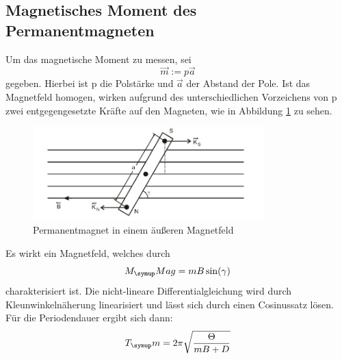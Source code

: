 \subsection{Magnetisches Moment des Permanentmagneten}
Um das magnetische Moment zu messen, sei
\begin{equation}
  \vec{m}:=p\vec{a}
\end{equation}
gegeben. Hierbei ist p die Polstärke und $\vec{a}$ der Abstand der Pole. Ist das
Magnetfeld homogen, wirken aufgrund des unterschiedlichen Vorzeichens von p zwei
entgegengesetzte Kräfte auf den Magneten, wie in Abbildung \ref{magnet} zu sehen.
\begin{figure}[H]
  \centering
  \includegraphics[width=0.8\textwidth]{bilder/magnet.jpg}
  \caption{Permanentmagnet in einem äußeren Magnetfeld \cite{102}}
  \label{magnet}
\end{figure}
Es wirkt ein Magnetfeld, welches durch
\begin{equation}
  M_\su{Mag}=mB\sin(\gamma)
\end{equation}
charakterisiert ist. Die nicht-lineare Differentialgleichung wird durch
Kleunwinkelnäherung linearisiert und lässt sich durch einen Cosinussatz lösen.
Für die Periodendauer ergibt sich dann:
\begin{equation}
  T_\su{m}=2\pi\sqrt{\frac{\Theta}{mB+D}}
  \label{eq:magperi}
\end{equation}
